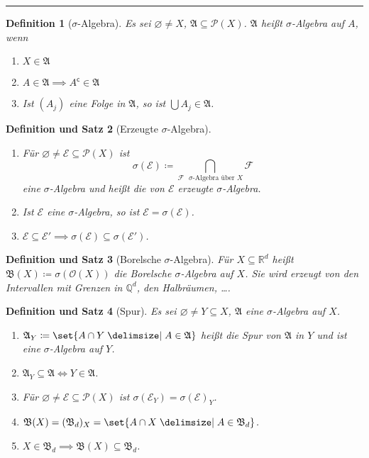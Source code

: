 \documentclass[a4paper]{article}
\newcounter{Sec}
\theoremstyle{marginbreak}
\newtheorem{definition}{Definition}[Sec]
\newtheorem{defsatz}[definition]{Definition und Satz}
\newcommand{\sep}{%
	\rule{\textwidth}{0.3pt}%
	\stepcounter{Sec}%
	}
\renewcommand{\P}{\mathcal{P}}
\newcommand{\R}{\mathbb{R}}
\newcommand{\A}{\mathfrak{A}}
\newcommand{\B}{\mathfrak{B}}
\newcommand{\compl}[1]{#1^\mathsf{c}}
\newcommand{\sa}{$\sigma$-Algebra}
\begin{document}
	\sep
	\begin{definition}[\sa{}]
		Es sei $\varnothing\neq X$, $\A\subseteq\P(X)$. $\A$ heißt \sa{} auf $A$, wenn
		\begin{enumerate}[label=($\sigma_{\arabic*}$)]
			\item $X\in\A$
			\item $A\in\A\implies\compl{A}\in\A$
			\item Ist $(A_j)$ eine Folge in $\A$, so ist $\bigcup A_j\in\A$.
		\end{enumerate}
	\end{definition}
	\begin{defsatz}[Erzeugte \sa{}]
		\begin{enumerate}[label=(\alph*)]
			\item Für $\varnothing\neq\mathcal{E}\subseteq\P(X)$ ist
				\[
					\sigma(\mathcal{E})\coloneqq \bigcap_{\text{$\mathcal{F}$ \sa{} über $X$}}\mathcal{F}
				\]
				eine \sa{} und heißt die von $\mathcal{E}$ erzeugte \sa{}.
			\item Ist $\mathcal{E}$ eine \sa{}, so ist $\mathcal{E}=\sigma(\mathcal{E})$.
			\item $\mathcal{E}\subseteq\mathcal{E}'\implies \sigma(\mathcal{E})\subseteq\sigma(\mathcal{E}')$.
		\end{enumerate}
	\end{defsatz}
	\begin{defsatz}[Borelsche \sa{}]
		Für $X\subseteq\R^d$ heißt $\B(X)\coloneqq\sigma(\mathcal{O}(X))$ die Borelsche \sa{} auf $X$. Sie wird
		erzeugt von den Intervallen mit Grenzen in $\mathbb{Q}^d$, den Halbräumen, \dots.
	\end{defsatz}
	\begin{defsatz}[Spur]
		Es sei $\varnothing\neq Y\subseteq X$, $\A$ eine \sa{} auf $X$.
		\begin{enumerate}[label=(\alph*)]
			\item $\A_Y\coloneqq\set{A\cap Y\given A\in \A}$ heißt die Spur von $\A$ in $Y$ und ist eine \sa{} auf $Y$.
			\item $\A_Y\subseteq\A\iff Y\in\A$.
			\item Für $\varnothing\neq\mathcal{E}\subseteq\P(X)$ ist $\sigma(\mathcal{E}_Y)=\sigma(\mathcal{E})_Y$.
			\item $\B(X) = (\B_d)_X = \set{A\cap X\given A\in \B_d}$.
			\item $X\in\B_d\implies \B(X)\subseteq \B_d$.
		\end{enumerate}
	\end{defsatz}
\end{document}
